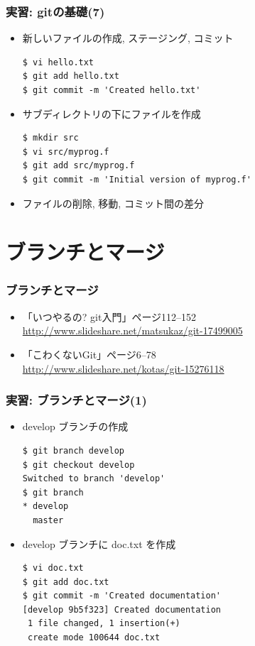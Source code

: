 \begin{frame}[t,fragile]
  \frametitle{実習: gitの基礎(7)}
  \begin{itemize}
  \item 新しいファイルの作成, ステージング, コミット
\begin{lstlisting}
$ vi hello.txt
$ git add hello.txt
$ git commit -m 'Created hello.txt'
\end{lstlisting}
  \item サブディレクトリの下にファイルを作成
\begin{lstlisting}
$ mkdir src
$ vi src/myprog.f
$ git add src/myprog.f
$ git commit -m 'Initial version of myprog.f'
\end{lstlisting}
  \item ファイルの削除, 移動, コミット間の差分
  \end{itemize}
\end{frame}

\section{ブランチとマージ}

\begin{frame}
  \frametitle{ブランチとマージ}
  \begin{itemize}
  \item 「いつやるの? git入門」ページ112--152 \\
    \url{http://www.slideshare.net/matsukaz/git-17499005}
  \item 「こわくないGit」ページ6--78 \\
    \url{http://www.slideshare.net/kotas/git-15276118}
  \end{itemize}
\end{frame}

\begin{frame}[t,fragile]
  \frametitle{実習: ブランチとマージ(1)}
  \begin{itemize}
  \item develop ブランチの作成
\begin{lstlisting}
$ git branch develop
$ git checkout develop
Switched to branch 'develop'
$ git branch
* develop
  master
\end{lstlisting}
  \item develop ブランチに doc.txt を作成
\begin{lstlisting}
$ vi doc.txt
$ git add doc.txt
$ git commit -m 'Created documentation'
[develop 9b5f323] Created documentation
 1 file changed, 1 insertion(+)
 create mode 100644 doc.txt
\end{lstlisting}
  \end{itemize}
\end{frame}

